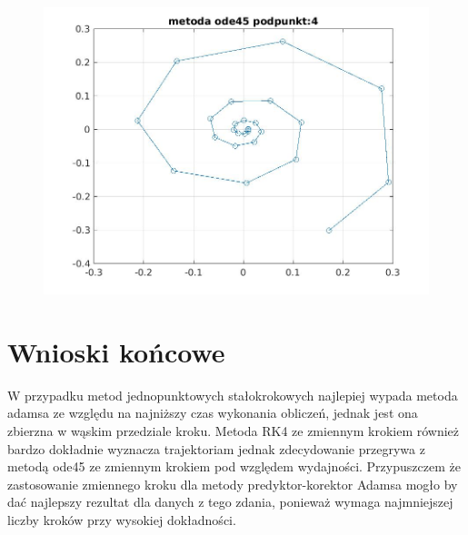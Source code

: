 \documentclass[a4paper, 12pt]{article}
\begin{document}
\begin{figure}[H]
\centering
\includegraphics[width = 15cm]{ode/metoda ode45 podpunkt:4.jpg}
\end{figure}

\section{Wnioski końcowe}
W przypadku metod jednopunktowych stałokrokowych najlepiej wypada metoda adamsa ze względu na najniższy czas wykonania obliczeń, jednak jest ona zbierzna w wąskim przedziale kroku. Metoda RK4 ze zmiennym krokiem również bardzo dokładnie wyznacza trajektoriam jednak zdecydowanie przegrywa z metodą ode45 ze zmiennym krokiem pod względem wydajności. Przypuszczem że zastosowanie zmiennego kroku dla metody predyktor-korektor Adamsa mogło by dać najlepszy rezultat dla danych z tego zdania, ponieważ wymaga najmniejszej liczby kroków przy wysokiej dokładności. 
\end{document}
